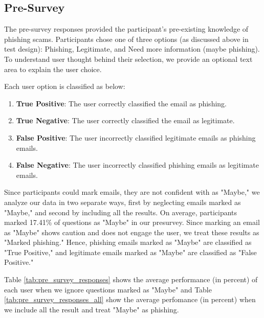 \subsection{Pre-Survey}
The pre-survey responses provided the participant's pre-existing knowledge of phishing scams. Participants chose one of three options (as discussed above in test design): Phishing, Legitimate, and Need more information (maybe phishing). To understand user thought behind their selection, we provide an optional text area to explain the user choice.

Each user option is classified as below:

\begin{enumerate}
    \setlength{\itemsep}{0pt}
    \setlength{\parskip}{0pt}
    \setlength{\topsep}{0pt}
    \item \textbf{True Positive}: The user correctly classified the email as phishing.
    \item \textbf{True Negative}: The user correctly classified the email as legitimate.
    \item \textbf{False Positive}: The user incorrectly classified legitimate emails as phishing emails.
    \item \textbf{False Negative}: The user incorrectly classified phishing emails as legitimate emails.
\end{enumerate}

Since participants could mark emails, they are not confident with as "Maybe," we analyze our data in two separate ways, first by neglecting emails marked as "Maybe," and second by including all the results. On average, participants marked 17.41\% of questions as "Maybe" in our presurvey. Since marking an email as "Maybe" shows caution and does not engage the user, we treat these results as "Marked phishing." Hence, phishing emails marked as "Maybe" are classified as "True Positive," and legitimate emails marked as "Maybe" are classified as "False Positive."

Table \ref{tab:pre_survey_responses} shows the average performance (in percent) of each user when we ignore questions marked as "Maybe" and Table \ref{tab:pre_survey_responses_all} show the average perfomance (in percent) when we include all the result and treat "Maybe" as phishing.

